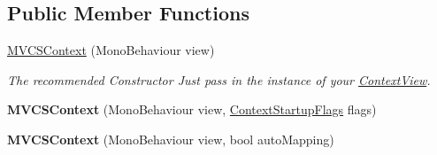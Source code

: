 \subsection*{Public Member Functions}
\begin{DoxyCompactItemize}
\item 
\hyperlink{classstrange_1_1extensions_1_1context_1_1impl_1_1_m_v_c_s_context_a0da858110e2cfbc9e9888bc49c5552e9}{M\-V\-C\-S\-Context} (Mono\-Behaviour view)
\begin{DoxyCompactList}\small\item\em The recommended Constructor Just pass in the instance of your \hyperlink{classstrange_1_1extensions_1_1context_1_1impl_1_1_context_view}{Context\-View}. \end{DoxyCompactList}\item 
\hypertarget{classstrange_1_1extensions_1_1context_1_1impl_1_1_m_v_c_s_context_aedb7fa6e8b6aa4c1626d8894c3f44212}{{\bfseries M\-V\-C\-S\-Context} (Mono\-Behaviour view, \hyperlink{namespacestrange_1_1extensions_1_1context_1_1api_a6e67a548377c1491bddc3a81c0f312c5}{Context\-Startup\-Flags} flags)}\label{classstrange_1_1extensions_1_1context_1_1impl_1_1_m_v_c_s_context_aedb7fa6e8b6aa4c1626d8894c3f44212}

\item 
\hypertarget{classstrange_1_1extensions_1_1context_1_1impl_1_1_m_v_c_s_context_a69268030fc2426e14ac535771c1a746b}{{\bfseries M\-V\-C\-S\-Context} (Mono\-Behaviour view, bool auto\-Mapping)}\label{classstrange_1_1extensions_1_1context_1_1impl_1_1_m_v_c_s_context_a69268030fc2426e14ac535771c1a746b}


\end{DoxyCompactItemize}
